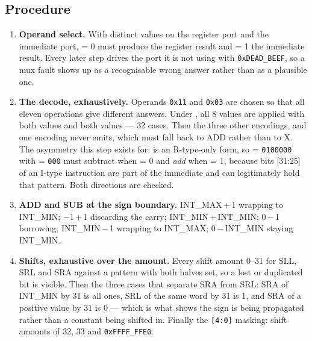 \subsection*{Procedure}

\begin{enumerate}[leftmargin=*,itemsep=3pt]
\item[\textbf{1}] \textbf{Operand select.} With distinct values on the register
port and the immediate port,  = 0 must produce the register
result and  = 1 the immediate result. Every later step drives the
port it is not using with \texttt{0xDEAD\_BEEF}, so a mux fault shows up as a
recognisable wrong answer rather than as a plausible one.

\item[\textbf{2}] \textbf{The decode, exhaustively.} Operands \texttt{0x11} and
\texttt{0x03} are chosen so that all eleven operations give different answers.
Under , all 8  values are applied with both
 values and both  values --- 32 cases. Then the three
other  encodings, and one encoding  never emits,
which must fall back to ADD rather than to X. \\
The asymmetry this step exists for:  is an R-type-only form, so
 = \texttt{0100000} with  = \texttt{000} must subtract
when  = 0 and \emph{add} when  = 1, because bits
[31:25] of an I-type instruction are part of the immediate and can legitimately
hold that pattern. Both directions are checked.

\item[\textbf{3}] \textbf{ADD and SUB at the sign boundary.} INT\_MAX\,+\,1
wrapping to INT\_MIN; $-1$\,+\,1 discarding the carry; INT\_MIN\,+\,INT\_MIN;
0\,$-$\,1 borrowing; INT\_MIN\,$-$\,1 wrapping to INT\_MAX;
0\,$-$\,INT\_MIN staying INT\_MIN.

\item[\textbf{4}] \textbf{Shifts, exhaustive over the amount.} Every shift
amount 0--31 for SLL, SRL and SRA against a pattern with both halves set, so a
lost or duplicated bit is visible. Then the three cases that separate SRA from
SRL: SRA of INT\_MIN by 31 is all ones, SRL of the same word by 31 is 1, and
SRA of a positive value by 31 is 0 --- which is what shows the sign is being
propagated rather than a constant being shifted in. Finally the \texttt{[4:0]}
masking: shift amounts of 32, 33 and \texttt{0xFFFF\_FFE0}.


\end{enumerate}

